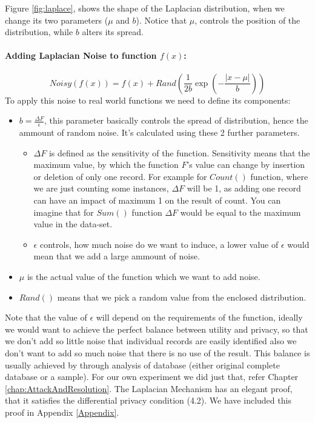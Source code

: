 \documentclass[12pt]{report}
\theoremstyle{named}
\begin{document}
Figure \ref{fig:laplace}, shows the shape of the Laplacian distribution, when we change its two parameters ($\mu$ and $b$). Notice that $\mu$, controls the position of the distribution, while $b$ alters its spread.

\paragraph{Adding Laplacian Noise to function $f(x)$:\\}
\begin{equation}
Noisy(f(x)) =f(x) + Rand( \frac{1}{2b} \exp(-\frac{\left | x-\mu  \right |}{b}))
\end{equation}
To apply this noise to real world functions we need to define its components:
\begin{itemize}
  \item $b = \frac{\Delta F}{\epsilon} $, this parameter basically controls the spread of distribution, hence the ammount of random noise. It's calculated using these 2 further parameters.
  \begin{itemize}
  \item ${\Delta F}$ is defined as the sensitivity of the function. Sensitivity means that the maximum value, by which the function $F$'s value can change by insertion or deletion of only one record. For example for $Count()$ function, where we are just counting some instances, $\Delta F$ will be 1, as adding one record can have an impact of maximum 1 on the result of count. You can imagine that for $Sum()$ function $\Delta F$ would be equal to the maximum value in the data-set.
  \item ${\epsilon}$ controls, how much noise do we want to induce, a lower value of $\epsilon$ would mean that we add a large ammount of noise.
  \end{itemize}
  \item $\mu$ is the actual value of the function which we want to add noise.
  \item  $Rand()$ means that we pick a random value from the enclosed distribution.
\end{itemize}

Note that the value of $\epsilon$ will depend on the requirements of the function, ideally we would want to achieve the perfect balance between utility and privacy, so that we don't add so little noise that individual records are easily identified also we don't want to add so much noise that there is no use of the result. This balance is usually achieved by through analysis of database (either original complete database or a sample). For our own experiment we did just that, refer Chapter \ref{chap:AttackAndResolution}.
The Laplacian Mechanism has an elegant proof, that it satisfies the differential privacy condition (4.2). We have included this proof in Appendix \ref{Appendix}.
\end{document}
